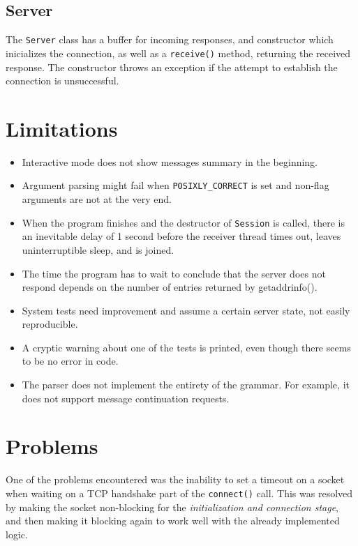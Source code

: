 \documentclass[a4]{report}
\begin{document}
\subsection{Server}

The \texttt{Server} class has a buffer for incoming responses, and constructor which inicializes the connection, as well as a \texttt{receive()} method, returning the received response. The constructor throws an exception if the attempt to establish the connection is unsuccessful.

\section{Limitations}

\begin{itemize}
  \item Interactive mode does not show messages summary in the beginning.
  \item Argument parsing might fail when \texttt{POSIXLY\_CORRECT} is set and non-flag arguments are not at the very end.
  \item When the program finishes and the destructor of \texttt{Session} is called, there is an inevitable delay of 1 second before the receiver thread times out, leaves uninterruptible sleep, and is joined.
  \item The time the program has to wait to conclude that the server does not respond depends on the number of entries returned by getaddrinfo().
  \item System tests need improvement and assume a certain server state, not easily reproducible.
  \item A cryptic warning about one of the tests is printed, even though there seems to be no error in code.
  \item The parser does not implement the entirety of the grammar. For example, it does not support message continuation requests.
\end{itemize}

\section{Problems}

One of the problems encountered was the inability to set a timeout on a socket when waiting on a TCP handshake part of the \texttt{connect()} call. This was resolved by making the socket non-blocking for the \textit{initialization and connection stage}, and then making it blocking again to work well with the already implemented logic.\cite{timeout-sof}
\end{document}
